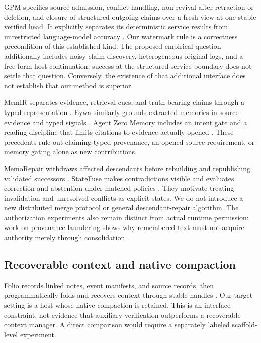 GPM specifies source admission, conflict handling, non-revival after
retraction or deletion, and closure of structured outgoing claims over a
fresh view at one stable verified head. It explicitly separates its
deterministic service results from unrestricted language-model accuracy
\citep{xu2026gpm}. Our watermark rule is a correctness precondition of
this established kind. The proposed empirical question additionally
includes noisy claim discovery, heterogeneous original logs, and a
free-form host continuation; success at the structured service boundary
does not settle that question. Conversely, the existence of that
additional interface does not establish that our method is superior.

MemIR separates evidence, retrieval cues, and truth-bearing claims
through a typed representation \citep{jin2026memir}. Eywa similarly
grounds extracted memories in source evidence and typed signals
\citep{joshi2026eywa}. Agent Zero Memory includes an intent gate and a
reading discipline that limits citations to evidence actually opened
\citep{wu2026agentzero}. These precedents rule out claiming typed
provenance, an opened-source requirement, or memory gating alone as new
contributions.

MemoRepair withdraws affected descendants before rebuilding and
republishing validated successors \citep{zhao2026memorepair}. StateFuse
makes contradictions visible and evaluates correction and abstention
under matched policies \citep{volkov2026statefuse}. They motivate
treating invalidation and unresolved conflicts as explicit states. We do
not introduce a new distributed merge protocol or general
descendant-repair algorithm. The authorization experiments also remain
distinct from actual runtime permission: work on provenance laundering
shows why remembered text must not acquire authority merely through
consolidation \citep{xuj2026provenancelaundering}.

\subsection{Recoverable context and native
compaction}\label{recoverable-context-and-native-compaction}

Folio records linked notes, event manifests, and source records, then
programmatically folds and recovers context through stable handles
\citep{ruan2026folio}. Our target setting is a host whose native
compaction is retained. This is an interface constraint, not evidence
that auxiliary verification outperforms a recoverable context manager. A
direct comparison would require a separately labeled scaffold-level
experiment.

